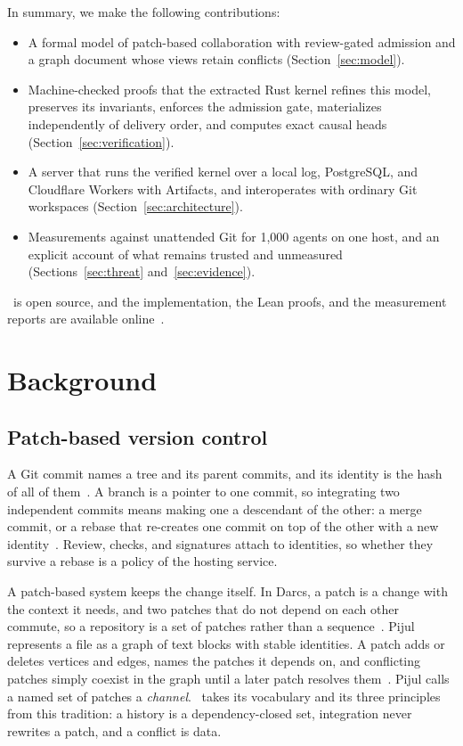 In summary, we make the following contributions:
\begin{itemize}
\item A formal model of patch-based collaboration with review-gated admission and a graph document whose views retain conflicts (Section~\ref{sec:model}).
\item Machine-checked proofs that the extracted Rust kernel refines this model, preserves its invariants, enforces the admission gate, materializes independently of delivery order, and computes exact causal heads (Section~\ref{sec:verification}).
\item A server that runs the verified kernel over a local log, PostgreSQL, and Cloudflare Workers with Artifacts, and interoperates with ordinary Git workspaces (Section~\ref{sec:architecture}).
\item Measurements against unattended Git for 1,000 agents on one host, and an explicit account of what remains trusted and unmeasured (Sections~\ref{sec:threat} and~\ref{sec:evidence}).
\end{itemize}
\sys\ is open source, and the implementation, the Lean proofs, and the measurement reports are available online~\cite{o1s}.

\section{Background}\label{sec:background}
\subsection{Patch-based version control}
A Git commit names a tree and its parent commits, and its identity is the hash of all of them~\cite{gitobjects}. A branch is a pointer to one commit, so integrating two independent commits means making one a descendant of the other: a merge commit, or a rebase that re-creates one commit on top of the other with a new identity~\cite{gitrebase}. Review, checks, and signatures attach to identities, so whether they survive a rebase is a policy of the hosting service.

A patch-based system keeps the change itself. In Darcs, a patch is a change with the context it needs, and two patches that do not depend on each other commute, so a repository is a set of patches rather than a sequence~\cite{darcs}. Pijul represents a file as a graph of text blocks with stable identities. A patch adds or deletes vertices and edges, names the patches it depends on, and conflicting patches simply coexist in the graph until a later patch resolves them~\cite{pijul}. Pijul calls a named set of patches a \emph{channel}. \sys\ takes its vocabulary and its three principles from this tradition: a history is a dependency-closed set, integration never rewrites a patch, and a conflict is data.

